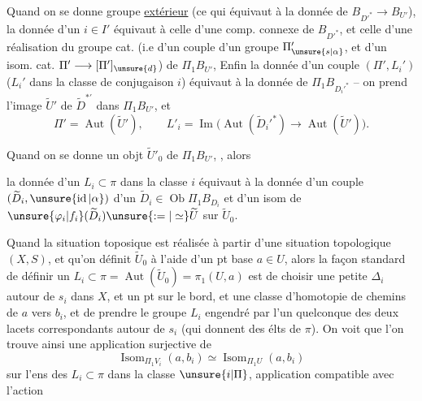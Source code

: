 Quand on se donne   groupe \uline{extérieur}  (ce qui  équivaut à la donnée de \(B_{D'^*}\longrightarrow B_{U'}\)), la donnée d'un  \(i\in I'\) équivaut à celle d'une comp. connexe de \(B_{D'^*}\), et celle d'une réalisation  du groupe cat. (i.e d'un couple d'un groupe \(\Pi'_{\unsure{s|\alpha}}\), et d'un isom. cat. \(\Pi'\longrightarrow[\Pi']_{\unsure{d}}\))   de \(\Pi_1B_{U'}\), Enfin la donnée d'un couple \((\Pi',L_i')\) (\(L_i'\) dans la classe de conjugaison \(i\)) équivaut  à la donnée   de \(\Pi_1B_{D_i'^*}\) -- on prend l'image \(\widetilde U'\) de \(\widetilde D^{*'}\) dans \(\Pi_1B_{U'}\), et
\[
\Pi'=\operatorname{Aut}(\widetilde U'),\qquad
L'_i=\operatorname{Im}\bigl(\operatorname{Aut}(\widetilde D_i'^*)\longrightarrow
\operatorname{Aut}(\widetilde U')\bigr).
\]

Quand on se donne   un objt \(\widetilde U'_0\) de \(\Pi_1B_{U'}\),  , alors


la donnée d'un \(L_i\subset\pi\) dans la classe \(i\) équivaut à la donnée d'un couple \((\widetilde D_i,\unsure{\operatorname{id}|\alpha})\) d'un \(\widetilde D_i\in\operatorname{Ob}\Pi_1B_{D_i}\) et d'un isom de \(\unsure{\varphi_i|f_i}(\widetilde D_i)\unsure{:=|\simeq}\widetilde U\) sur \(\widetilde U_0\).

Quand  la situation toposique est réalisée à partir d'une situation topologique \((X,S)\), et qu'on définit \(\widetilde U_0\) à l'aide d'un pt base \(a\in U\), alors la façon standard de définir un \(L_i\subset\pi=\operatorname{Aut}(\widetilde U_0)=\pi_1(U,a)\) est de choisir une petite  \(\Delta_i\) autour de \(s_i\) dans \(X\),
et un pt  sur le bord, et une classe d'homotopie de chemins  de \(a\) vers \(b_i\), et de prendre le groupe \(L_i\) engendré par l'un quelconque des deux lacets correspondants autour de \(s_i\) (qui donnent des  élts  de \(\pi\)).
On voit que l'on trouve ainsi une application surjective de
\[
\operatorname{Isom}_{\Pi_1V_i}(a,b_i)\simeq
\operatorname{Isom}_{\Pi_1U}(a,b_i)
\]
 sur l'ens des \(L_i\subset\pi\) dans la classe \(\unsure{i|\Pi}\), application  compatible avec l'action

